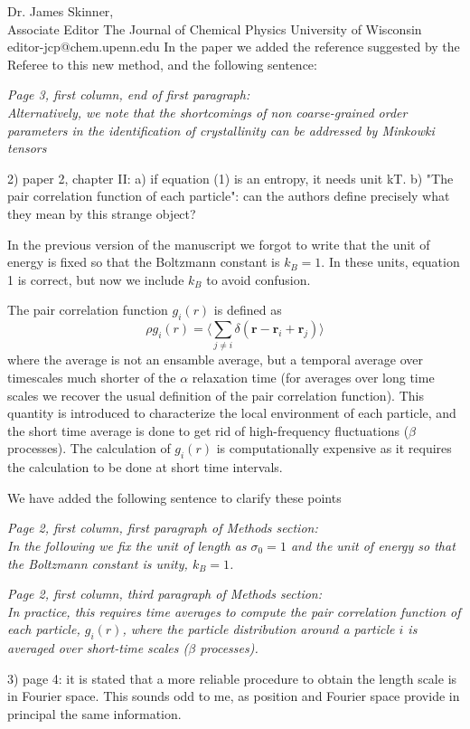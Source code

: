 \documentclass[a4paper, rebuttal, parskip=true, firsthead=false, fromemail=false, foldmarks=false]{scrlttr2}
\begin{document}
\begin{letter}{Dr. James Skinner,\\Associate Editor
The Journal of Chemical Physics
University of Wisconsin\\
editor-jcp@chem.upenn.edu }
In the paper we added the reference suggested by the Referee to this new method, and the following sentence:

{\it Page 3, first column, end of first paragraph:\\
Alternatively, we note that the shortcomings of
non coarse-grained order parameters in the identification of crystallinity can be addressed by Minkowki tensors~\cite{kapfer2012jammed}
}


\begin{quotationi}
2) paper 2, chapter II: a) if equation (1) is an entropy, it needs unit kT.
b) "The pair correlation function of each particle": can the authors
define precisely what they mean by this strange object?
\end{quotationi}

In the previous version of the manuscript we forgot to write that the unit of energy is
fixed so that the Boltzmann constant is $k_B=1$. In these units, equation 1 is correct, but now we include
$k_B$ to avoid confusion.

The pair correlation function $g_i(r)$ is defined as
$$
\rho g_i(r)=\langle \sum_{j\neq i}\delta(\mathbf{r}-\mathbf{r}_i+\mathbf{r}_j)\rangle
$$
where the average is not an ensamble average, but a temporal average over timescales much shorter
of the $\alpha$ relaxation time (for averages over long time scales we recover the usual definition
of the pair correlation function). This quantity is introduced to characterize the local environment
of each particle, and the short time average is done to get rid of high-frequency fluctuations ($\beta$ processes).
The calculation of $ g_i(r)$ is computationally expensive as it requires the calculation to be done at short
time intervals.

We have added the following sentence to clarify these points

{\it Page 2, first column, first paragraph of Methods section:\\
In the following we fix the unit of length as $\sigma_0=1$ and the unit
of energy so that the Boltzmann constant is unity, $k_B=1$.
}

{\it Page 2, first column, third paragraph of Methods section:\\
In practice, this requires time averages to compute the pair correlation function of each particle, $g_i(r)$,
where the particle distribution around a particle $i$ is averaged over short-time scales ($\beta$ processes).
}

\begin{quotationi}
3) page 4: it is stated that a more reliable procedure to obtain the
length scale is in Fourier space. This sounds odd to me, as position and
Fourier space provide in principal the same information.
\end{quotationi}


\end{letter}
\end{document}
